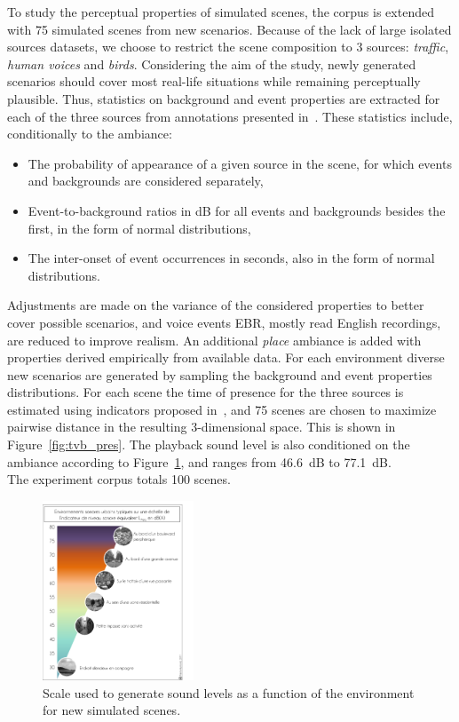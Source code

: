 \documentclass[11pt,a4paper]{article}
\begin{document}
To study the perceptual properties of simulated scenes, the corpus is extended with 75 simulated scenes from new scenarios. Because of the lack of large isolated sources datasets, we choose to restrict the scene composition to 3 sources: \textit{traffic}, \textit{human voices} and \textit{birds}. Considering the aim of the study, newly generated scenarios should cover most real-life situations while remaining perceptually plausible. Thus, statistics on background and event properties are extracted for each of the three sources from annotations presented in~\cite{jrg}. These statistics include, conditionally to the ambiance:
\begin{itemize}
\item The probability of appearance of a given source in the scene, for which events and backgrounds are considered separately,
\item Event-to-background ratios in dB for all events and backgrounds besides the first, in the form of normal distributions,
\item The inter-onset of event occurrences in seconds, also in the form of normal distributions.
\end{itemize}
Adjustments are made on the variance of the considered properties to better cover possible scenarios, and voice events EBR, mostly read English recordings, are reduced to improve realism. An additional \textit{place} ambiance is added with properties derived empirically from available data. For each environment diverse new scenarios are generated by sampling the background and event properties distributions. For each scene the time of presence for the three sources is estimated using indicators proposed in~\cite{gontier}, and 75 scenes are chosen to maximize pairwise distance in the resulting 3-dimensional space. This is shown in Figure~\ref{fig:tvb_pres}. The playback sound level is also conditioned on the ambiance according to Figure~\ref{fig:amb_levels}, and ranges from 46.6~dB to 77.1~dB.\\

The experiment corpus totals 100 scenes.

\begin{figure}[!h]
    \centering
    \includegraphics[width=0.4\textwidth]{figures/leqa.png}
    \caption{Scale used to generate sound levels as a function of the environment for new simulated scenes.}\label{fig:amb_levels}
\end{figure}
\end{document}
